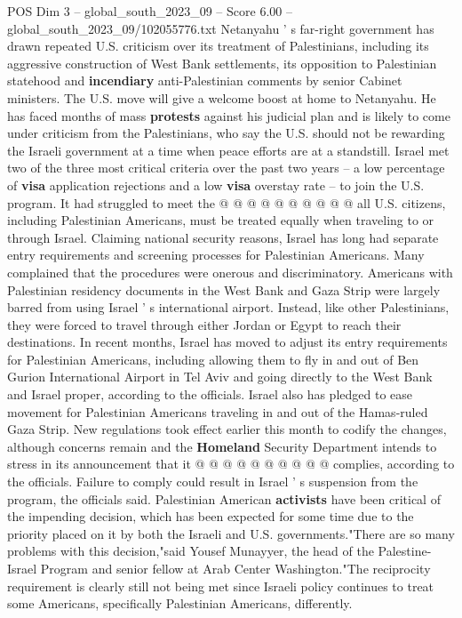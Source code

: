 \begin{textsample}{POS Dim 3 – global\_south\_2023\_09 – Score 6.00 – global\_south\_2023\_09/102055776.txt}
Netanyahu ' s far-right government has drawn repeated U.S. criticism over its treatment of Palestinians, including its aggressive construction of West Bank settlements, its opposition to Palestinian statehood and \textbf{incendiary} anti-Palestinian comments by senior Cabinet ministers.
The U.S. move will give a welcome boost at home to Netanyahu.
He has faced months of mass \textbf{protests} against his judicial plan and is likely to come under criticism from the Palestinians, who say the U.S. should not be rewarding the Israeli government at a time when peace efforts are at a standstill.
Israel met two of the three most critical criteria over the past two years -- a low percentage of \textbf{visa} application rejections and a low \textbf{visa} overstay rate -- to join the U.S. program.
It had struggled to meet the @ @ @ @ @ @ @ @ @ @ all U.S. citizens, including Palestinian Americans, must be treated equally when traveling to or through Israel.
Claiming national security reasons, Israel has long had separate entry requirements and screening processes for Palestinian Americans.
Many complained that the procedures were onerous and discriminatory.
Americans with Palestinian residency documents in the West Bank and Gaza Strip were largely barred from using Israel ' s international airport.
Instead, like other Palestinians, they were forced to travel through either Jordan or Egypt to reach their destinations.
In recent months, Israel has moved to adjust its entry requirements for Palestinian Americans, including allowing them to fly in and out of Ben Gurion International Airport in Tel Aviv and going directly to the West Bank and Israel proper, according to the officials.
Israel also has pledged to ease movement for Palestinian Americans traveling in and out of the Hamas-ruled Gaza Strip.
New regulations took effect earlier this month to codify the changes, although concerns remain and the \textbf{Homeland} Security Department intends to stress in its announcement that it @ @ @ @ @ @ @ @ @ @ complies, according to the officials.
Failure to comply could result in Israel ' s suspension from the program, the officials said.
Palestinian American \textbf{activists} have been critical of the impending decision, which has been expected for some time due to the priority placed on it by both the Israeli and U.S. governments."There are so many problems with this decision,"said Yousef Munayyer, the head of the Palestine-Israel Program and senior fellow at Arab Center Washington."The reciprocity requirement is clearly still not being met since Israeli policy continues to treat some Americans, specifically Palestinian Americans, differently.

\end{textsample}
